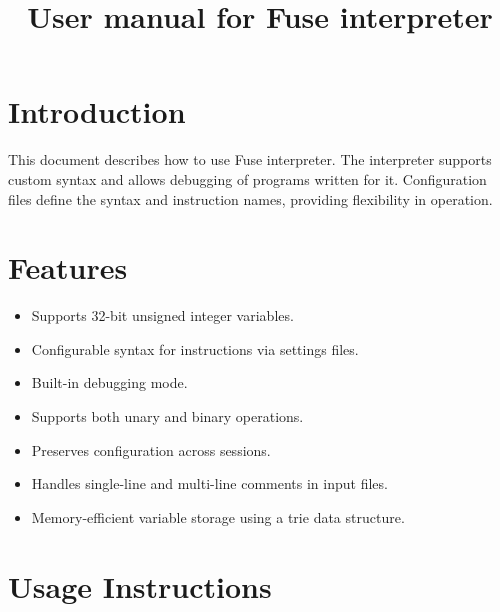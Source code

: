 \documentclass[a4paper,12pt]{article}
\title{\textbf{User manual for Fuse interpreter}}
\author{}
\date{}
\begin{document}
\maketitle

\section{Introduction}
This document describes how to use Fuse interpreter. The interpreter supports custom syntax and allows debugging of programs written for it. Configuration files define the syntax and instruction names, providing flexibility in operation.

\section{Features}
\begin{itemize}
	\item Supports 32-bit unsigned integer variables.
	\item Configurable syntax for instructions via settings files.
	\item Built-in debugging mode.
	\item Supports both unary and binary operations.
	\item Preserves configuration across sessions.
	\item Handles single-line and multi-line comments in input files.
	\item Memory-efficient variable storage using a trie data structure.
\end{itemize}

\newpage

\section{Usage Instructions}
\end{document}
